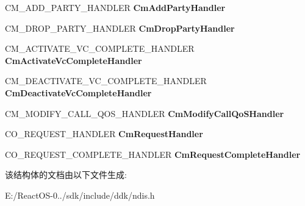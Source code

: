 \begin{DoxyCompactItemize}
C\+M\+\_\+\+A\+D\+D\+\_\+\+P\+A\+R\+T\+Y\+\_\+\+H\+A\+N\+D\+L\+ER {\bfseries Cm\+Add\+Party\+Handler}
\item 
\mbox{\label{struct___n_d_i_s___c_a_l_l___m_a_n_a_g_e_r___c_h_a_r_a_c_t_e_r_i_s_t_i_c_s_af293045ab75a9f50849b03d572a1c016}} 
C\+M\+\_\+\+D\+R\+O\+P\+\_\+\+P\+A\+R\+T\+Y\+\_\+\+H\+A\+N\+D\+L\+ER {\bfseries Cm\+Drop\+Party\+Handler}
\item 
\mbox{\label{struct___n_d_i_s___c_a_l_l___m_a_n_a_g_e_r___c_h_a_r_a_c_t_e_r_i_s_t_i_c_s_a8c4747671735ded2bb013eb2088f765e}} 
C\+M\+\_\+\+A\+C\+T\+I\+V\+A\+T\+E\+\_\+\+V\+C\+\_\+\+C\+O\+M\+P\+L\+E\+T\+E\+\_\+\+H\+A\+N\+D\+L\+ER {\bfseries Cm\+Activate\+Vc\+Complete\+Handler}
\item 
\mbox{\label{struct___n_d_i_s___c_a_l_l___m_a_n_a_g_e_r___c_h_a_r_a_c_t_e_r_i_s_t_i_c_s_aec233e68967f267ab9abe82f6537f942}} 
C\+M\+\_\+\+D\+E\+A\+C\+T\+I\+V\+A\+T\+E\+\_\+\+V\+C\+\_\+\+C\+O\+M\+P\+L\+E\+T\+E\+\_\+\+H\+A\+N\+D\+L\+ER {\bfseries Cm\+Deactivate\+Vc\+Complete\+Handler}
\item 
\mbox{\label{struct___n_d_i_s___c_a_l_l___m_a_n_a_g_e_r___c_h_a_r_a_c_t_e_r_i_s_t_i_c_s_a17ff48e991ceacec5b63d1aaaf4d44be}} 
C\+M\+\_\+\+M\+O\+D\+I\+F\+Y\+\_\+\+C\+A\+L\+L\+\_\+\+Q\+O\+S\+\_\+\+H\+A\+N\+D\+L\+ER {\bfseries Cm\+Modify\+Call\+Qo\+S\+Handler}
\item 
\mbox{\label{struct___n_d_i_s___c_a_l_l___m_a_n_a_g_e_r___c_h_a_r_a_c_t_e_r_i_s_t_i_c_s_ae90966d59a86fe4b30b1f3e773348880}} 
C\+O\+\_\+\+R\+E\+Q\+U\+E\+S\+T\+\_\+\+H\+A\+N\+D\+L\+ER {\bfseries Cm\+Request\+Handler}
\item 
\mbox{\label{struct___n_d_i_s___c_a_l_l___m_a_n_a_g_e_r___c_h_a_r_a_c_t_e_r_i_s_t_i_c_s_a474874d8554a9d055138d4084b42dffc}} 
C\+O\+\_\+\+R\+E\+Q\+U\+E\+S\+T\+\_\+\+C\+O\+M\+P\+L\+E\+T\+E\+\_\+\+H\+A\+N\+D\+L\+ER {\bfseries Cm\+Request\+Complete\+Handler}
\end{DoxyCompactItemize}


该结构体的文档由以下文件生成\+:\begin{DoxyCompactItemize}
\item 
E\+:/\+React\+O\+S-\/0../sdk/include/ddk/ndis.\+h\end{DoxyCompactItemize}
